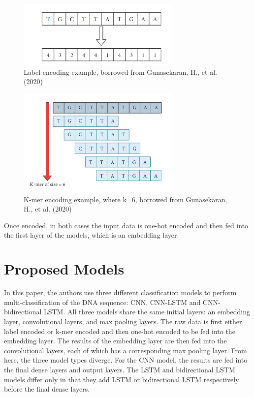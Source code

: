 \documentclass[journal]{IEEEtran}
\begin{document}
  \begin{figure}
    \centering
    \includegraphics[width=8cm]{figures/label_encoding.png}
    \caption{Label encoding example, borrowed from Gunasekaran, H., et al. (2020)}
  \end{figure}

  \begin{figure}
    \centering
    \includegraphics[width=8cm]{figures/kmer_encoding.png}
    \caption{K-mer encoding example, where k=6, borrowed from Gunasekaran, H., et al. (2020)}
  \end{figure}

  Once encoded, in both cases the input data is one-hot encoded and then fed into
  the first layer of the models, which is an embedding layer.

\section{Proposed Models}
  In this paper, the authors use three different classification models to perform multi-classification
  of the DNA sequence: CNN, CNN-LSTM and CNN-bidirectional LSTM.
  All three models share the same initial layers: an embedding layer, convolutional layers, and
  max pooling layers. The raw data is first either label encoded or k-mer encoded and then
  one-hot encoded to be fed into the embedding layer. The results of the embedding layer
  are then fed into the convolutional layers, each of which has a corresponding max pooling layer.
  From here, the three model types diverge. For the CNN model, the results are fed into
  the final dense layers and output layers. The LSTM and bidirectional LSTM models differ only
  in that they add LSTM or bidirectional LSTM respectively before the final dense layers.
\end{document}
